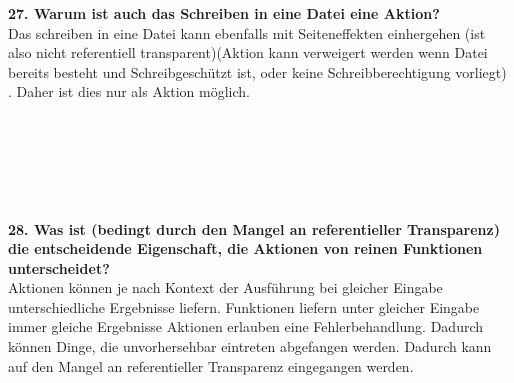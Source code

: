 \documentclass{article}
\begin{document}
\\
\\
\\
\\
\\
\textbf{27. Warum ist auch das Schreiben in eine Datei eine Aktion?}
\\
Das schreiben in eine Datei kann ebenfalls mit Seiteneffekten einhergehen (ist also nicht referentiell transparent)(Aktion kann verweigert werden wenn Datei bereits besteht und Schreibgesch\"utzt ist, oder keine Schreibberechtigung vorliegt)%
. Daher ist dies nur als Aktion möglich.\\
\\
\\
\\
\\
\\
\\
\textbf{28. Was ist (bedingt durch den Mangel an referentieller Transparenz) die entscheidende Eigenschaft, die Aktionen von reinen Funktionen unterscheidet?}
\\
Aktionen k\"onnen je nach Kontext der Ausf\"uhrung bei gleicher Eingabe unterschiedliche Ergebnisse liefern. Funktionen liefern unter gleicher Eingabe immer gleiche Ergebnisse
Aktionen erlauben eine Fehlerbehandlung. Dadurch können Dinge, die unvorhersehbar eintreten abgefangen werden.  Dadurch kann auf den Mangel an referentieller Transparenz eingegangen werden.\\
\\
\\
\\
\\
\\
\\
\end{document}
